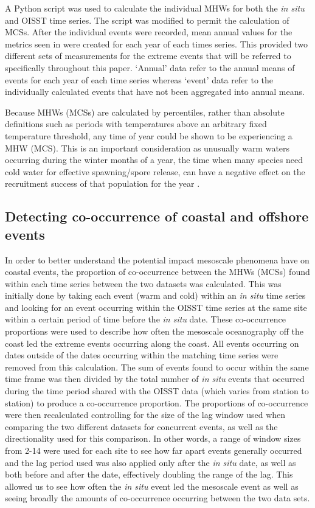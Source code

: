 \documentclass[a4paper,10pt,review]{elsarticle}
\begin{document}
A Python script \citep[https://github.com/ecjoliver/marineHeatWaves; see][]{Hobday2016} was used to calculate the individual MHWs for both the \emph{in situ} and OISST time series. The script was modified to permit the calculation of MCSs. After the individual events were recorded, mean annual values for the metrics seen in  were created for each year of each times series. This provided two different sets of measurements for the extreme events that will be referred to specifically throughout this paper. `Annual' data refer to the annual means of events for each year of each time series whereas `event' data refer to the individually calculated events that have not been aggregated into annual means.

Because MHWs (MCSs) are calculated by percentiles, rather than absolute definitions such as periods with temperatures above an arbitrary fixed temperature threshold, any time of year could be shown to be experiencing a MHW (MCS). This is an important consideration as unusually warm waters occurring during the winter months of a year, the time when many species need cold water for effective spawning/spore release, can have a negative effect on the recruitment success of that population for the year \citep{Wernberg2011}.

\subsection{Detecting co-occurrence of coastal and offshore events}
In order to better understand the potential impact mesoscale phenomena have on coastal events, the proportion of co-occurrence between the MHWs (MCSs) found within each time series between the two datasets was calculated. This was initially done by taking each event (warm and cold) within an \emph{in situ} time series and looking for an event occurring within the OISST time series at the same site within a certain period of time before the \emph{in situ} date. These co-occurrence proportions were used to describe how often the mesoscale oceanography off the coast led the extreme events occurring along the coast. All events occurring on dates outside of the dates occurring within the matching time series were removed from this calculation. The sum of events found to occur within the same time frame was then divided by the total number of \emph{in situ} events that occurred during the time period shared with the OISST data (which varies from station to station) to produce a co-occurrence proportion. The proportions of co-occurrence were then recalculated controlling for the size of the lag window used when comparing the two different datasets for concurrent events, as well as the directionality used for this comparison. In other words, a range of window sizes from 2-14 were used for each site to see how far apart events generally occurred and the lag period used was also applied only after the \emph{in situ} date, as well as both before and after the date, effectively doubling the range of the lag. This allowed us to see how often the \emph{in situ} event led the mesoscale event as well as seeing broadly the amounts of co-occurrence occurring between the two data sets.
\end{document}
